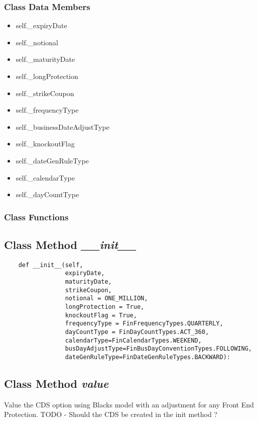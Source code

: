 \documentclass[twoside,11pt]{book}
\begin{document}
\subsubsection{Class Data Members}
\begin{itemize}
\item{self.\_expiryDate}
\item{self.\_notional}
\item{self.\_maturityDate}
\item{self.\_longProtection}
\item{self.\_strikeCoupon}
\item{self.\_frequencyType}
\item{self.\_businessDateAdjustType}
\item{self.\_knockoutFlag}
\item{self.\_dateGenRuleType}
\item{self.\_calendarType}
\item{self.\_dayCountType}
\end{itemize}

\subsubsection{Class Functions}

\subsection{Class Method {\it \_\_init\_\_}}


\begin{lstlisting}
    def __init__(self, 
                 expiryDate,
                 maturityDate,
                 strikeCoupon,
                 notional = ONE_MILLION,
                 longProtection = True,
                 knockoutFlag = True,
                 frequencyType = FinFrequencyTypes.QUARTERLY,
                 dayCountType = FinDayCountTypes.ACT_360,
                 calendarType=FinCalendarTypes.WEEKEND,
                 busDayAdjustType=FinBusDayConventionTypes.FOLLOWING,
                 dateGenRuleType=FinDateGenRuleTypes.BACKWARD):
\end{lstlisting}

\subsection{Class Method {\it value}}
Value the CDS option using Blacks model with an adjustment for any Front End Protection. TODO - Should the CDS be created in the init method ? 
\end{document}

